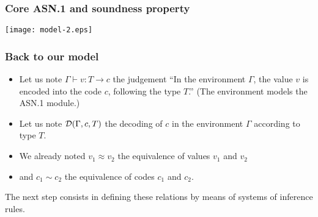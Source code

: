 \documentclass[compress,dvips,xcolor={dvipsnames},t]{beamer}
\newcommand{\coding}[4]{#1 \vdash #2 : #3 \rightarrow #4}
\newcommand{\decoding}[3]{{\cal D}(#1,#2,#3)}
\newcommand\ASN{\textsf{ASN.1}\xspace}
\begin{document}
\begin{frame}
\frametitle{Core \ASN and soundness property}

\centerline{\texttt{[image: model-2.eps]}}

\end{frame}

\begin{frame}
\frametitle{Back to our model}

\begin{itemize}

  \item Let us note $\coding{\Gamma}{v}{T}{c}$ the judgement ``In the
    environment $\Gamma$, the value $v$ is encoded into the code $c$,
    following the type $T$.''  (The environment models the \ASN
    module.)

  \item Let us note $\decoding{\Gamma}{c}{T}$ the decoding of $c$ in
    the environment $\Gamma$ according to type $T$.

  \item We already noted $v_1 \approx v_2$ the equivalence of values
    $v_1$ and $v_2$

  \item and $c_1 \sim c_2$ the equivalence of codes $c_1$ and $c_2$.

\end{itemize}

The next step consists in defining these relations by means of systems
of inference rules.

\end{frame}
\end{document}
